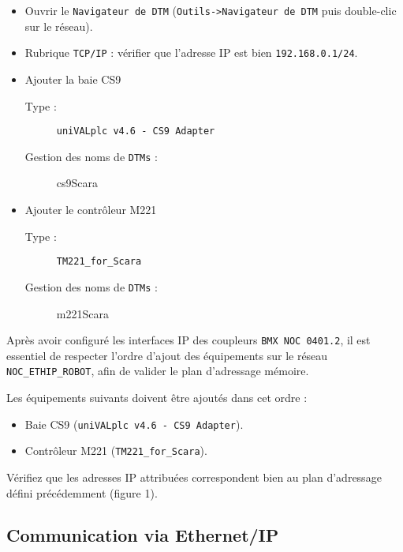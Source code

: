 \begin{UPSTIManipulation}
    \begin{itemize}
        \item Ouvrir le \texttt{Navigateur de DTM} (\texttt{Outils->Navigateur de DTM} puis double-clic sur le réseau).
        \item Rubrique \texttt{TCP/IP} : vérifier que l'adresse IP est bien \texttt{192.168.0.1/24}.
        \end{itemize}
    \begin{itemize}
        \item Ajouter la baie CS9 
        \begin{description}
            \item [Type :] \texttt{uniVALplc v4.6 - CS9 Adapter}
            \item [Gestion des noms de \texttt{DTMs} :] cs9Scara
        \end{description}
        \item Ajouter le contrôleur M221
        \begin{description}
            \item [Type :] \texttt{TM221\_for\_Scara}
            \item [Gestion des noms de \texttt{DTMs} :] m221Scara
        \end{description}
    \end{itemize}
\end{UPSTIManipulation}

Après avoir configuré les interfaces IP des coupleurs \texttt{BMX NOC 0401.2}, il est essentiel de respecter l'ordre d'ajout des équipements sur le réseau \texttt{NOC\_ETHIP\_ROBOT}, afin de valider le plan d'adressage mémoire.

Les équipements suivants doivent être ajoutés dans cet ordre :
\begin{itemize}
    \item Baie CS9 (\texttt{uniVALplc v4.6 - CS9 Adapter}).
    \item Contrôleur M221 (\texttt{TM221\_for\_Scara}).
\end{itemize}

Vérifiez que les adresses IP attribuées correspondent bien au plan d'adressage défini précédemment (figure 1).

\subsection{Communication via Ethernet/IP}

